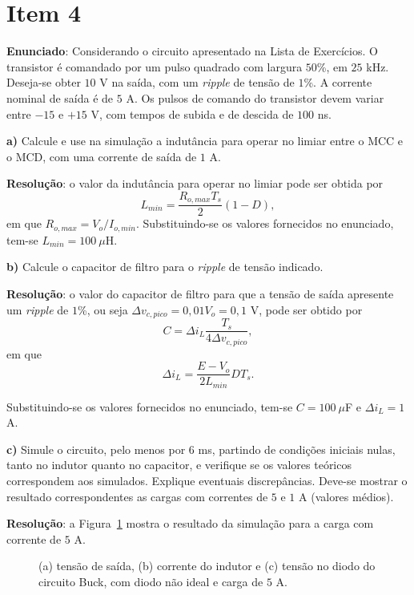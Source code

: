 \section*{Item 4}\label{it:4}

\textbf{Enunciado}: Considerando o circuito apresentado na Lista de Exercícios.  O  transistor  é comandado  por  um  pulso  quadrado  com  largura  $50$\%,  em  $25$ kHz.  Deseja-se obter $10$ V na saída, com um \textit{ripple} de tensão de $1$\%. A corrente nominal de saída é de $5$ A. Os pulsos de comando do transistor devem variar entre $-15$ e $+15$ V, com tempos de subida e de descida de $100$ ns.

\medskip
\textbf{a)} Calcule e use na simulação a indutância para operar no limiar entre o MCC e o MCD, com uma corrente de saída de $1$ A.

\medskip
\textbf{Resolução}: o valor da indutância para operar no limiar pode ser obtida por
\begin{equation*}
	L_{min} = \frac{R_{o,max}T_s}{2}(1 - D),
\end{equation*}
em que $R_{o,max} = V_o/I_{o,min}$. Substituindo-se os valores fornecidos no enunciado, tem-se $L_{min} = 100~\mu$H.

\medskip
\textbf{b)} Calcule o capacitor de filtro para o \textit{ripple} de tensão indicado.

\medskip
\textbf{Resolução}: o valor do capacitor de filtro para que a tensão de saída apresente um \textit{ripple} de $1$\%, ou seja $\Delta v_{c,pico} = 0{,}01V_o = 0{,}1$ V, pode ser obtido por
\begin{equation*}
	C = \Delta i_L\frac{T_s}{4\Delta v_{c,pico}},
\end{equation*}
em que
\begin{equation*}
	\Delta i_L = \frac{E - V_o}{2L_{min}}DT_s.
\end{equation*}

Substituindo-se os valores fornecidos no enunciado, tem-se $C = 100~\mu$F e $\Delta i_L = 1$ A.

\medskip
\textbf{c)} Simule o circuito, pelo menos por $6$ ms, partindo de condições iniciais nulas, tanto no indutor  quanto no capacitor, e verifique se os valores teóricos correspondem aos simulados. Explique eventuais discrepâncias. Deve-se mostrar o resultado correspondentes as cargas com correntes de $5$ e $1$ A (valores médios).

\medskip
\textbf{Resolução}: a Figura~\ref{fig:ex4_1} mostra o resultado da simulação para a carga com corrente de $5$ A.
\begin{figure}[htb!]
	\centering
	
	\caption{(a) tensão de saída, (b) corrente do indutor e (c) tensão no diodo do circuito Buck, com diodo não ideal e carga de $5$ A.}
	\label{fig:ex4_1}
\end{figure}

